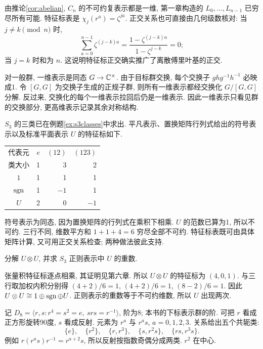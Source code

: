 由推论\ref{cor:abelian}, $C_n$ 的不可约复表示都是一维, 第一章构造的 $L_0,\ldots,L_{n-1}$ 已穷尽所有可能. 特征标表是 $\chi_j(r^a)=\zeta^{ja}$. 正交关系也可直接由几何级数核对: 当 $j\ne k\pmod n$ 时,
\[
 \sum_{a=0}^{n-1}\zeta^{(j-k)a}=\frac{1-\zeta^{(j-k)n}}{1-\zeta^{j-k}}=0;
\]
当 $j=k$ 时和为 $n$. 这说明特征标正交确实推广了离散傅里叶基的正交.

对一般群, 一维表示是同态 $G\to\mathbb C^\times$. 由于目标群交换, 每个交换子 $ghg^{-1}h^{-1}$ 必映成1. 令 $[G,G]$ 为交换子生成的正规子群, 则所有一维表示都经交换化 $G/[G,G]$ 分解. 反过来, 交换化的每个一维表示拉回后仍是一维表示. 因此一维表示只看见群的交换部分, 更高维表示记录其余对称结构.

$S_3$ 的三类已在例题\ref{ex:s3classes}中求出. 平凡表示、置换矩阵行列式给出的符号表示以及标准平面表示 $U$ 的特征标如下.
\begin{center}
\begin{tabular}{c|rrr}
\toprule
代表元 &$e$&$(12)$&$(123)$\\
类大小 &1&3&2\\\midrule
$1$&1&1&1\\
$\operatorname{sgn}$&1&$-1$&1\\
$U$&2&0&$-1$\\\bottomrule
\end{tabular}
\end{center}
符号表示为同态, 因为置换矩阵的行列式在乘积下相乘. $U$ 的范数已算为1, 所以不可约. 三行不同, 维数平方和 $1+1+4=6$ 穷尽全部不可约. 特征标表既可由具体矩阵计算, 又可用正交关系检查; 两种做法彼此支持.

\begin{example}
分解 $U\otimes U$, 并求 $S_3$ 正则表示中 $U$ 的重数.
\end{example}
\begin{solution}
张量积特征标逐点相乘, 其证明见第六章. 所以 $U\otimes U$ 的特征标为 $(4,0,1)$. 与三行取加权内积分别得 $(4+2)/6=1$, $(4+2)/6=1$, $(8-2)/6=1$. 因此 $U\otimes U\cong1\oplus\operatorname{sgn}\oplus U$. 正则表示的重数等于不可约维数, 所以 $U$ 出现两次.
\end{solution}

记 $D_8=\langle r,s:r^4=s^2=e,\ srs=r^{-1}\rangle$, 阶为8; 本书的下标表示群的阶. 可把 $r$ 看成正方形旋转90度, $s$ 看成反射. 元素为 $r^a$ 与 $r^as$, $a=0,1,2,3$. 关系给出五个共轭类:
\[
 \{e\},\quad\{r^2\},\quad\{r,r^3\},\quad\{s,r^2s\},\quad\{rs,r^3s\}.
\]
例如 $r(r^as)r^{-1}=r^{a+2}s$, 所以反射按指数奇偶分成两类. $r^2$ 在中心.

